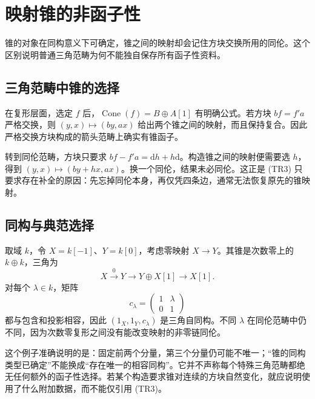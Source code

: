 
\section{映射锥的非函子性}
\label{b4:sec:1604}

锥的对象在同构意义下可确定，锥之间的映射却会记住方块交换所用的同伦。这个区别说明普通三角范畴为何不能独自保存所有函子性资料。


%
%
%

\subsection{三角范畴中锥的选择}
\label{b4:subsec:1604:01}

在复形层面，选定 \(f\) 后，\(\operatorname{Cone}(f)=B\oplus A[1]\) 有明确公式。若方块 \(bf=f'a\) 严格交换，则 \((y,x)\mapsto(by,ax)\) 给出两个锥之间的映射，而且保持复合。因此严格交换方块构成的箭头范畴上确实有锥函子。

\ProseParagraphBreak
转到同伦范畴，方块只要求 \(bf-f'a=\mathrm{d}h+h\mathrm{d}\)。构造锥之间的映射便需要选 \(h\)，得到 \((y,x)\mapsto(by+hx,ax)\)。换一个同伦，结果未必同伦。这正是 (TR3) 只要求存在补全的原因：先忘掉同伦本身，再仅凭四条边，通常无法恢复原先的锥映射。

\subsection{同构与典范选择}
\label{b4:subsec:1604:02}

取域 \(k\)，令 \(X=k[-1]\)、\(Y=k[0]\)，考虑零映射 \(X\to Y\)。其锥是次数零上的 \(k\oplus k\)，三角为
\[
 X\xrightarrow{0}Y\longrightarrow Y\oplus X[1]\longrightarrow X[1].
\]
对每个 \(\lambda\in k\)，矩阵
\[
 c_\lambda=\begin{pmatrix}1&\lambda\\0&1\end{pmatrix}
\]
都与包含和投影相容，因此 \((1_X,1_Y,c_\lambda)\) 是三角自同构。不同 \(\lambda\) 在同伦范畴中仍不同，因为次数零复形之间没有能改变映射的非零链同伦。

\ProseParagraphBreak
这个例子准确说明的是：固定前两个分量，第三个分量仍可能不唯一；“锥的同构类型已确定”不能换成“存在唯一的相容同构”。它并不声称每个特殊三角范畴都绝无任何额外的函子性选择。若某个构造要求锥对连续的方块自然变化，就应说明使用了什么附加数据，而不能仅引用 (TR3)。

